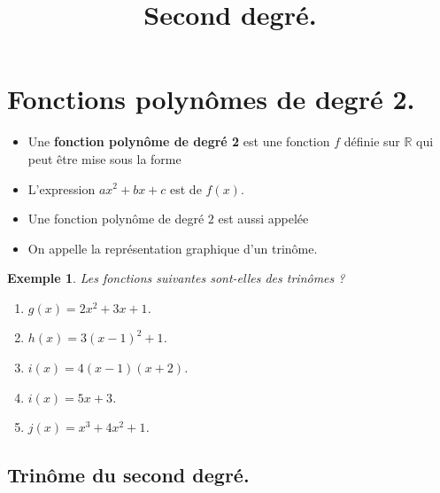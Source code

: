 \documentclass{beamer}
\title{Second degré.}
\newtheorem{exemple}{Exemple}
\begin{document}
  
  \begin{frame}
    
    \titlepage
    
  \end{frame}
  
  
    
  \section{Fonctions polynômes de degré 2.}
  \begin{frame} 
    
  \begin{definition}
    \begin{itemize}
     \item Une \textbf{fonction polynôme de degré 2} est une fonction 
     $f$ définie sur $\mathbb{R}$ qui peut être mise sous la forme 
      
     
   \item L'expression $ax^2+bx+c$ est  de $f(x)$.
     \item Une fonction polynôme de degré $2$ est aussi appelée 
     \item On appelle  la représentation graphique 
     d'un trinôme.
   \end{itemize}    
  \end{definition}
  
  \end{frame}
  
  \begin{frame}
    \begin{exemple}
    Les fonctions suivantes sont-elles des trinômes ?
    \begin{enumerate}
     \item $g(x)=2x^2+3x+1$. 
     \item $h(x)=3(x-1)^2+1$.
     \item $i(x)=4(x-1)(x+2)$.
     \item $i(x)=5x+3$.
     \item $j(x)=x^3+4x^2+1$.
     \end{enumerate}
  \end{exemple}
  \end{frame}
  
  \subsection{Trinôme du second degré.}
    
\end{document}
